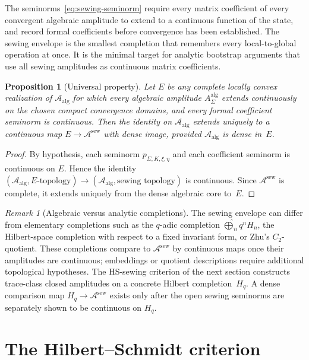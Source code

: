 \documentclass[11pt,reqno]{amsart}
\newtheorem{proposition}[theorem]{Proposition}
\theoremstyle{definition}
\theoremstyle{remark}
\newtheorem{remark}[theorem]{Remark}
\newcommand{\cA}{\mathcal{A}}
\numberwithin{equation}{section}
\begin{document}
The seminorms~\eqref{eq:sewing-seminorm} require every matrix
coefficient of every convergent algebraic amplitude to extend to a
continuous function of the state, and record formal coefficients
before convergence has been established. The sewing envelope is the
smallest completion that remembers every local-to-global operation
at once.
It is the minimal target for analytic bootstrap arguments that use
all sewing amplitudes as continuous matrix coefficients.

\begin{proposition}[Universal property]\label{prop:sewing-universal}
Let $E$ be any complete locally convex realization of
$\cA_{\mathrm{alg}}$ for which every algebraic amplitude
$A_\Sigma^{\mathrm{alg}}$ extends continuously on the chosen
compact convergence domains, and every formal coefficient seminorm
is continuous. Then the identity on $\cA_{\mathrm{alg}}$ extends
uniquely to a continuous map
$E \to \cA^{\mathrm{sew}}$ with dense image, provided
$\cA_{\mathrm{alg}}$ is dense in~$E$.
\end{proposition}

\begin{proof}
By hypothesis, each seminorm $p_{\Sigma,K,\xi,\eta}$ and each
coefficient seminorm is continuous on $E$. Hence the identity
$(\cA_{\mathrm{alg}},E\text{-topology}) \to
(\cA_{\mathrm{alg}},\text{sewing topology})$ is continuous. Since
$\cA^{\mathrm{sew}}$ is complete, it extends uniquely from the dense
algebraic core to~$E$.
\end{proof}

\begin{remark}[Algebraic versus analytic completions]
The sewing envelope can differ from elementary completions
such as the $q$-adic completion
$\widehat{\bigoplus}_n q^n H_n$, the Hilbert-space completion
with respect to a fixed invariant form, or Zhu's $C_2$-quotient.
These completions compare to $\cA^{\mathrm{sew}}$ by continuous maps
once their amplitudes are continuous; embeddings or quotient
descriptions require additional topological hypotheses. The
HS-sewing criterion of the next section constructs trace-class
closed amplitudes on a concrete Hilbert completion~$H_q$.
A dense comparison map $H_q\to\cA^{\mathrm{sew}}$ exists only after
the open sewing seminorms are separately shown to be continuous on
$H_q$.
\end{remark}

\section{The Hilbert--Schmidt criterion}\label{sec:hs-criterion}
\end{document}
